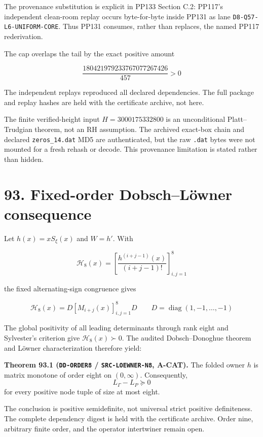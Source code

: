 \documentclass[
  11pt,
]{book}
\renewenvironment{quote}
  {\begin{tcolorbox}[
      enhanced,
      breakable,
      colback=tncream,
      colframe=tnrust,
      boxrule=0.8pt,
      arc=1.5pt,
      left=7pt,
      right=7pt,
      top=6pt,
      bottom=6pt]}
  {\end{tcolorbox}}
\begin{document}
The provenance substitution is explicit in PP133 Section C.2: PP117's
independent clean-room replay occurs byte-for-byte inside PP131 as lane
\texttt{D8-Q57-L6-UNIFORM-CORE}. Thus PP131 consumes, rather than
replaces, the named PP117 rederivation.

The cap overlaps the tail by the exact positive amount

\[
\boxed{
\frac{180421979233767077267426}{457}>0
}
\tag{92.3}
\]

The independent replays reproduced all declared dependencies. The full
package and replay hashes are held with the certificate archive, not
here.

The finite verified-height input \(H=3000175332800\) is an unconditional
Platt--Trudgian theorem, not an RH assumption. The archived exact-box
chain and declared \texttt{zeros\_14.dat} MD5 are authenticated, but the
raw \texttt{.dat} bytes were not mounted for a fresh rehash or decode.
This provenance limitation is stated rather than hidden.

\section{93. Fixed-order Dobsch--Löwner
consequence}\label{fixed-order-dobschluxf6wner-consequence}

Let \(h(x)=xS_\xi(x)\) and \(W=h'\). With

\[
\mathcal H_8(x)=
\left[\frac{h^{(i+j-1)}(x)}{(i+j-1)!}\right]_{i,j=1}^{8}
\]

the fixed alternating-sign congruence gives

\[
\mathcal H_8(x)=D[M_{i+j}(x)]_{i,j=1}^{8}D
\qquad D=\operatorname{diag}(1,-1,\ldots,-1)
\tag{93.1}
\]

The global positivity of all leading determinants through rank eight and
Sylvester's criterion give \(\mathcal H_8(x)\succ0\). The audited
Dobsch--Donoghue theorem and Löwner characterization therefore yield:

\begin{quote}
\textbf{Theorem 93.1 (\texttt{DD-ORDER8} / \texttt{SRC-LOEWNER-N8},
A-CAT).} The folded owner \(h\) is matrix monotone of order eight on
\((0,\infty)\). Consequently, \[
\boxed{L_\Gamma-L_P\succeq0}
\tag{93.2}
\] for every positive node tuple of size at most eight.
\end{quote}

The conclusion is positive semidefinite, not universal strict positive
definiteness. The complete dependency digest is held with the
certificate archive. Order nine, arbitrary finite order, and the
operator intertwiner remain open.
\end{document}

